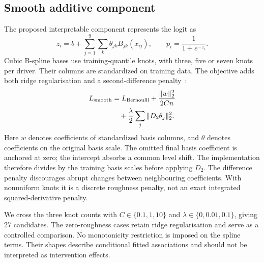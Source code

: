 \documentclass[conference]{IEEEtran}
\begin{document}
\subsection{Smooth additive component}
The proposed interpretable component represents the logit as
\begin{equation}
 z_i=b+\sum_{j=1}^{9}\sum_{k}\theta_{jk}B_{jk}(x_{ij}),
 \qquad p_i=\frac{1}{1+e^{-z_i}}.
\end{equation}
Cubic B-spline bases use training-quantile knots, with three, five or seven knots per driver. Their columns are standardized on training data. The objective adds both ridge regularisation and a second-difference penalty~\cite{eilers}:
\begin{equation}
\begin{aligned}
 L_{\rm smooth}&=L_{\rm Bernoulli}+\frac{\|w\|_2^2}{2Cn}\\
 &\quad+\frac{\lambda}{2}\sum_j\|D_2\theta_j\|_2^2.
\end{aligned}
\end{equation}
Here $w$ denotes coefficients of standardized basis columns, and $\theta$ denotes coefficients on the original basis scale. The omitted final basis coefficient is anchored at zero; the intercept absorbs a common level shift. The implementation therefore divides by the training basis scales before applying $D_2$. The difference penalty discourages abrupt changes between neighbouring coefficients. With nonuniform knots it is a discrete roughness penalty, not an exact integrated squared-derivative penalty.

We cross the three knot counts with $C\in\{0.1,1,10\}$ and $\lambda\in\{0,0.01,0.1\}$, giving 27 candidates. The zero-roughness cases retain ridge regularisation and serve as a controlled comparison. No monotonicity restriction is imposed on the spline terms. Their shapes describe conditional fitted associations and should not be interpreted as intervention effects.
\end{document}
